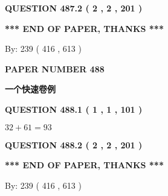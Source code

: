 \documentclass{ctexart}
\begin{document}
{\textbf{\Large{QUESTION
487.2 
 ( 2 , 2 , 201 )
}}}
  
  
   
   
 \vspace{0.2in}
 
   
   
   
   
\vspace{1.0in} 
{\textbf{\large{ *** END OF PAPER, THANKS *** }}} 
   
   
\hspace{1.0in} By: 
 239 ( 416 ,  613 )
   
   
   
   
\newpage 
\setcounter{page}{ 
   488001 } 
   
   
   
   
 {\textbf{ \Large{ PAPER NUMBER  488  }}}
   
   
\vspace{0.2in}
   
   
   
   
   
   
 \vspace{0.2in}
{\LARGE {\textbf{ 一个快速卷例}}}
   
   
  
\vspace{0.2in}
  
{\textbf{\Large{QUESTION
488.1 
 ( 1 , 1 , 101 )
}}}
  
  
 
 

$ %
32 +  %
61=   %
93$
 
 
  
\vspace{0.2in}
  
{\textbf{\Large{QUESTION
488.2 
 ( 2 , 2 , 201 )
}}}
  
  
   
   
 \vspace{0.2in}
 
   
   
   
   
\vspace{1.0in} 
{\textbf{\large{ *** END OF PAPER, THANKS *** }}} 
   
   
\hspace{1.0in} By: 
 239 ( 416 ,  613 )
   
   
   
   
\newpage 
\setcounter{page}{ 
   489001 } 
   
\end{document}

